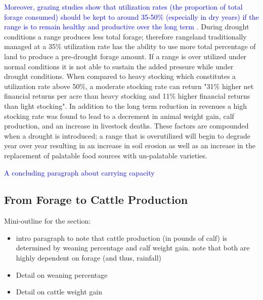 \documentclass[11pt]{article}
\begin{document}
\textcolor{blue}{Moreover, grazing studies show that utilization rates (the proportion of total forage consumed) should be kept to around 35-50\% (especially in dry years) if the range is to remain healthy and productive over the long term \citep{Holechek1999}.} During drought conditions a range produces less total forage; therefore rangeland traditionally managed at a 35\% utilization rate has the ability to use more total percentage of land to produce a pre-drought forage amount. If a range is over utilized under normal conditions it is not able to sustain the added pressure while under drought conditions. 
When compared to heavy stocking which constitutes a utilization rate above 50\%, a moderate stocking rate can return "31\% higher net financial returns per acre than heavy stocking and 11\% higher financial returns than light stocking"\citep{Holechek1999}. In addition to the long term reduction in revenues a high stocking rate was found to lead to a decrement in animal weight gain, calf production, and an increase in livestock deaths. These factors are compounded
when a drought is introduced; a range that is overutilized will begin to degrade year over year resulting in an increase in soil erosion as well as an increase in the replacement of palatable food sources with un-palatable varieties. 

\textcolor{blue}{A concluding paragraph about carrying capacity}


\subsection{From Forage to Cattle Production}
Mini-outline for the section:
\begin{itemize}
\item intro paragraph to note that cattle production (in pounds of calf) is determined by weaning percentage and calf weight gain. note that both are highly dependent on forage (and thus, rainfall)
\item Detail on weaning percentage
\item Detail on cattle weight gain
\end{itemize}
\end{document}
